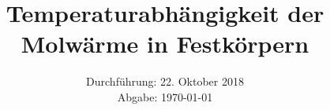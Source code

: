 

\subject{V 47}
\title{Temperaturabhängigkeit der Molwärme in Festkörpern}
\date{
  Durchführung: 22. Oktober 2018
  \\
  Abgabe: \today
}



\maketitle
\thispagestyle{empty}
\tableofcontents
\newpage






\printbibliography


